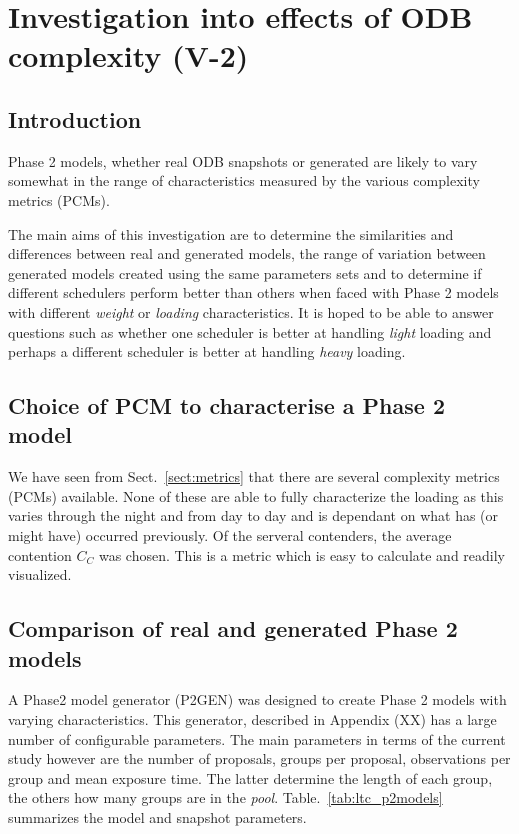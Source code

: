 \section{Investigation into effects of ODB complexity (V-2)}
\label{sect:exp_complexity}

\subsection{Introduction}
Phase 2 models, whether real ODB snapshots or generated are likely to vary somewhat in the range of characteristics measured by the various complexity metrics (PCMs). 

The main aims of this investigation are to determine the similarities and differences between real and generated models, the range of variation between generated models created using the same parameters sets and to determine if different schedulers perform better than others when faced with Phase 2 models with different \emph{weight} or \emph{loading} characteristics. It is hoped to be able to answer questions such as whether one scheduler is better at handling \emph{light} loading and perhaps a different scheduler is better at handling \emph{heavy} loading.

\subsection{Choice of PCM to characterise a Phase 2 model} 
We have seen from Sect.~\ref{sect:metrics} that there are several complexity metrics (PCMs) available. None of these are able to fully characterize the loading as this varies through the night and from day to day and is dependant on what has (or might have) occurred previously. Of the serveral contenders, the average contention $C_C$ was chosen. This is a metric which is easy to calculate and readily visualized.
 
\subsection{Comparison of real and generated Phase 2 models} 
A Phase2 model generator (P2GEN) was designed to create Phase 2 models with varying characteristics. This generator, described in Appendix (XX) has a large number of configurable parameters. The main parameters in terms of the current study however are the number of proposals, groups per proposal, observations per group and mean exposure time. The latter determine the length of each group, the others how many groups are in the \emph{pool}. Table.~\ref{tab:ltc_p2models} summarizes the model and snapshot parameters.

